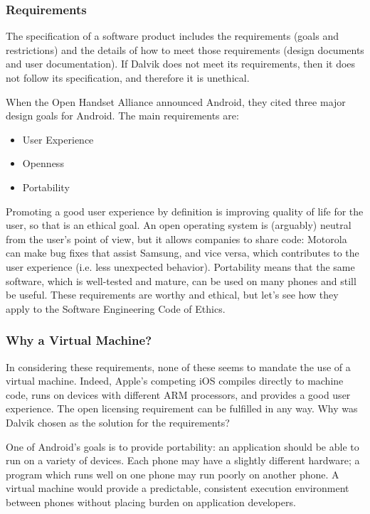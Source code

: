 \documentclass[11pt]{article}
\begin{document}
\begin{multicols}{2}
\subsubsection{Requirements} %
\label{ssub:requirements}

The specification of a software product includes the requirements (goals and
restrictions) and the details of how to meet those requirements (design
documents and user documentation).  If Dalvik does not meet its requirements,
then it does not follow its specification, and therefore it is unethical.

When the Open Handset Alliance announced Android, they cited three major
design goals for Android.  The main requirements are: \cite{open-handset-alliance-ann}

\begin{itemize}
    \item User Experience
    \item Openness
    \item Portability
\end{itemize}

Promoting a good user experience by definition is improving quality of life for
the user, so that is an ethical goal.  An open operating system is (arguably)
neutral from the user's point of view, but it allows companies to share code:
Motorola can make bug fixes that assist Samsung, and vice versa, which
contributes to the user experience (i.e. less unexpected behavior).  Portability
means that the same software, which is well-tested and mature, can be used on
many phones and still be useful.  These requirements are worthy and ethical, but let's
see how they apply to the Software Engineering Code of Ethics.


\subsubsection{Why a Virtual Machine?} %
\label{ssub:why-vm}

In considering these requirements, none of these seems to mandate the use of a
virtual machine.  Indeed, Apple's competing iOS compiles directly to machine
code, runs on devices with different ARM processors, and provides a good user
experience.  The open licensing requirement can be fulfilled in any way.  Why
was Dalvik chosen as the solution for the requirements?

One of Android's goals is to provide portability: an application should be able
to run on a variety of devices.  Each phone may have a slightly different
hardware; a program which runs well on one phone may run poorly on another
phone.  A virtual machine would provide a predictable, consistent execution
environment between phones without placing burden on application developers.


\end{multicols}
\end{document}
